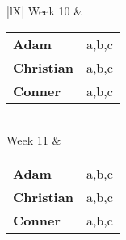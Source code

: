 \begin{table}[H]
\begin{tabularx}{\textwidth}{|lX|}
        Week 10 & 
        {
            \begin{tabularx}{\linewidth}{lX}
                \textbf{Adam} & a,b,c \\ 
                \textbf{Christian} & a,b,c \\
                \textbf{Conner} & a,b,c\\
            \end{tabularx}
        }\\
        Week 11 & 
        {
            \begin{tabularx}{\linewidth}{lX}
                \textbf{Adam} & a,b,c \\ 
                \textbf{Christian} & a,b,c \\
                \textbf{Conner} & a,b,c\\
            \end{tabularx}
        }\\
        \hline
    \end{tabularx}
\end{table}
